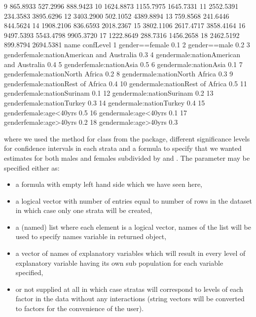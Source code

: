 \documentclass[
]{jss}
\newcommand{\1}{\mathcal{I}} \newcommand{\bZero}{\boldsymbol{0}}
\begin{document}
\begin{CodeChunk}
\begin{CodeOutput}
9          865.8933            527.2996            888.9423
10        1624.8873           1155.7975           1645.7331
11        2552.5391            234.3583           3895.6296
12        3403.2900            502.1052           4389.8894
13         759.8568            241.6446            844.5624
14        1908.2106            836.6593           2018.2367
15        3802.1106           2617.4717           3858.4164
16        9497.5393           5543.4798           9905.3720
17        1222.8649            288.7316           1456.2658
18        2462.5192            899.8794           2694.5381
                                        name confLevel
1                             gender==female       0.1
2                               gender==male       0.2
3  genderfemale:nationAmerican and Australia       0.3
4    gendermale:nationAmerican and Australia       0.4
5                    genderfemale:nationAsia       0.5
6                      gendermale:nationAsia       0.1
7            genderfemale:nationNorth Africa       0.2
8              gendermale:nationNorth Africa       0.3
9          genderfemale:nationRest of Africa       0.4
10           gendermale:nationRest of Africa       0.5
11                genderfemale:nationSurinam       0.1
12                  gendermale:nationSurinam       0.2
13                 genderfemale:nationTurkey       0.3
14                   gendermale:nationTurkey       0.4
15                    genderfemale:age<40yrs       0.5
16                      gendermale:age<40yrs       0.1
17                    genderfemale:age>40yrs       0.2
18                      gendermale:age>40yrs       0.3
\end{CodeOutput}
\end{CodeChunk}

\normalsize

where we used the  method for 
class from the  package, different significance levels
for confidence intervals in each strata and a formula to specify that we
wanted estimates for both males and females subdivided by 
and . The  parameter may be specified either as:

\begin{itemize}
\item a formula with empty left hand side which we have seen here,
\item a logical vector with number of entries equal to number of rows in the dataset in which case only one strata will be created,
\item a (named) list where each element is a logical vector, names of the list will be used to specify names variable in returned object,
\item a vector of names of explanatory variables which will result in every level of explanatory variable having its own sub population for each variable specified,
\item or not supplied at all in which case stratas will correspond to levels of each factor in the data without any interactions (string vectors will be converted to factors for the convenience of the user).
\end{itemize}
\end{document}
